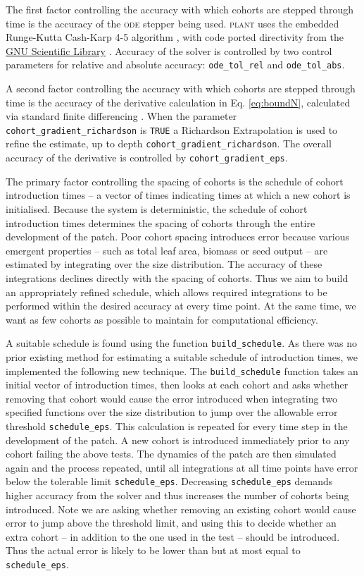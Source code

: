 \documentclass[10pt,twoside]{article}
\newcommand{\plant}{\textsc{plant}}
\begin{document}
The first factor controlling the accuracy with which cohorts are stepped
through time is the accuracy of the \textsc{ode} stepper being used. {\plant} uses
the embedded Runge-Kutta Cash-Karp 4-5 algorithm \citep{Cash-1990}, with
code ported directivity from the
\href{http://www.gnu.org/software/gsl/}{GNU Scientific Library}
\citep{Galassi-2009}. Accuracy of the solver is controlled by two
control parameters for relative and absolute accuracy:
\texttt{ode\_tol\_rel} and \texttt{ode\_tol\_abs}.

A second factor controlling the accuracy with which cohorts are stepped
through time is the accuracy of the derivative calculation in Eq.
\ref{eq:boundN}, calculated via standard finite differencing
\citep{Abramowitz-2012}. When the parameter
\texttt{cohort\_gradient\_richardson} is \texttt{TRUE} a Richardson Extrapolation
\citep{Stoer-2002} is used to refine the estimate, up to depth
\texttt{cohort\_gradient\_richardson}. The overall accuracy of the
derivative is controlled by \texttt{cohort\_gradient\_eps}.

The primary factor controlling the spacing of cohorts is the schedule of
cohort introduction times -- a vector of times indicating times at which
a new cohort is initialised. Because the system is deterministic, the
schedule of cohort introduction times determines the spacing of cohorts
through the entire development of the patch. Poor cohort spacing
introduces error because various emergent properties -- such as total
leaf area, biomass or seed output -- are estimated by integrating over
the size distribution. The accuracy of these integrations declines
directly with the spacing of cohorts. Thus we aim to build an
appropriately refined schedule, which allows required integrations to be
performed within the desired accuracy at every time point. At the same
time, we want as few cohorts as possible to maintain for computational
efficiency.

A suitable schedule is found using the function
\texttt{build\_schedule}. As there was no prior existing method for
estimating a suitable schedule of introduction times, we implemented the
following new technique. The \texttt{build\_schedule} function takes an
initial vector of introduction times, then looks at each cohort and asks
whether removing that cohort would cause the error introduced when
integrating two specified functions over the size distribution to jump
over the allowable error threshold \texttt{schedule\_eps}. This
calculation is repeated for every time step in the development of the
patch. A new cohort is introduced immediately prior to any cohort
failing the above tests. The dynamics of the patch are
then simulated again and the process repeated, until all integrations at
all time points have error below the tolerable limit
\texttt{schedule\_eps}. Decreasing \texttt{schedule\_eps} demands higher
accuracy from the solver and thus increases the number of cohorts being
introduced. Note we are asking whether removing an existing cohort would
cause error to jump above the threshold limit, and using this to decide
whether an extra cohort -- in addition to the one used in the test --
should be introduced. Thus the actual error is likely to
be lower than but at most equal to \texttt{schedule\_eps}.
\end{document}
